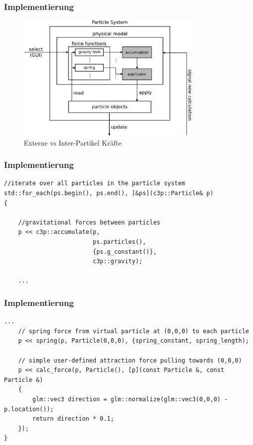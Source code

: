 \documentclass{beamer}
\begin{document}
\begin{frame}
\frametitle{Implementierung}
\begin{figure}[]
\centering
\includegraphics[width=0.8\textwidth]{images/detail2.pdf}
\caption{Externe vs Inter-Partikel Kr\"afte}
\end{figure}
\end{frame}


\begin{frame}[fragile]
\frametitle{Implementierung}
\begin{lstlisting}[caption=Beispiel von Berechnung und Anwendung von Kr\"aften]
//iterate over all particles in the particle system
std::for_each(ps.begin(), ps.end(), [&ps](c3p::Particle& p)
{

  	//gravitational forces between particles
	p << c3p::accumulate(p,
						 ps.particles(),
						 {ps.g_constant()},
    					 c3p::gravity);
    					 
	...
\end{lstlisting}
\end{frame}

\begin{frame}[fragile]
\frametitle{Implementierung}
\begin{lstlisting}[caption=Beispiel von Berechnung und Anwendung von Kr\"aften]
	...
	// spring force from virtual particle at (0,0,0) to each particle
	p << spring(p, Particle(0,0,0), {spring_constant, spring_length);

	// simple user-defined attraction force pulling towards (0,0,0)
	p << calc_force(p, Particle(), [p](const Particle &, const Particle &)
	{
    	glm::vec3 direction = glm::normalize(glm::vec3(0,0,0) - p.location());
		return direction * 0.1;
    });
}          
   
\end{lstlisting}
\end{frame}
\end{document}
